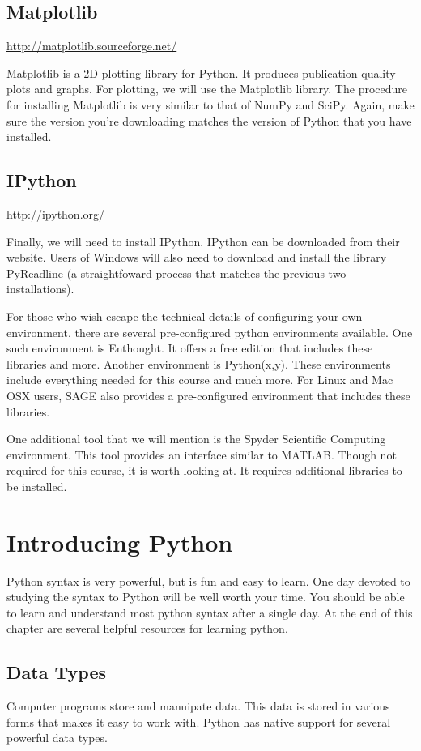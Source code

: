 \subsection*{Matplotlib}
\url{http://matplotlib.sourceforge.net/}

Matplotlib is a 2D plotting library for Python.  It produces publication quality plots and graphs.
For plotting, we will use the Matplotlib library.  The procedure for installing Matplotlib is very similar to that of NumPy and SciPy.  Again, make sure the version you're downloading matches the version of Python that you have installed.

\subsection*{IPython}
\url{http://ipython.org/}

Finally, we will need to install IPython.  IPython can be downloaded from their website.  Users of Windows will also need to download and install the library PyReadline (a straightfoward process that matches the previous two installations).

For those who wish escape the technical details of configuring your own environment, there are several pre-configured python environments available.  One such environment is Enthought.  It offers a free edition that includes these libraries and more.  Another environment is Python(x,y).  These environments include everything needed for this course and much more.  For Linux and Mac OSX users, SAGE also provides a pre-configured environment that includes these libraries.

One additional tool that we will mention is the Spyder Scientific Computing environment.  This tool provides an interface similar to MATLAB.  Though not required for this course, it is worth looking at.  It requires additional libraries to be installed.

\section*{Introducing Python}
Python syntax is very powerful, but is fun and easy to learn.  One day devoted to studying the syntax to Python will be well worth your time.  You should be able to learn and understand most python syntax after a single day.  At the end of this chapter are several helpful resources for learning python.

\subsection*{Data Types}
Computer programs store and manuipate data.  This data is stored in various forms that makes it easy to work with.  Python has native support for several powerful data types.

